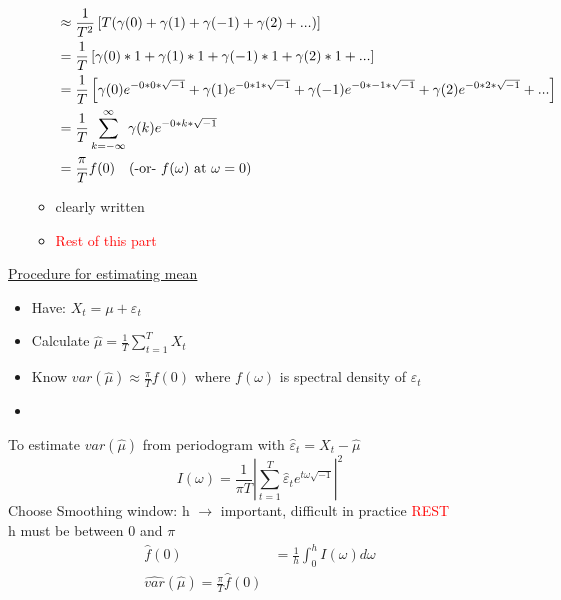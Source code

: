 \begin{itemize}
\begin{itemize}
\begin{align*}
            &\approx \frac{1}{T^2} \left[T(\gamma(0)+ \gamma(1)+\gamma(-1)+\gamma(2)+...) \right]\\
            &= \frac{1}{T} \left[\gamma(0)*1 + \gamma(1)*1+\gamma(-1)*1+\gamma(2)*1 +...\right] \\
            &= \frac{1}{T} \left[\gamma(0)e^{-0*0*\sqrt{-1}} + \gamma(1) e^{-0*1*\sqrt{-1}} + \gamma(-1) e^{-0*-1*\sqrt{-1}} + \gamma(2) e^{-0*2*\sqrt{-1}}+... \right] \\
            &=\frac{1}{T} \sum_{k=-\infty}^\infty \gamma(k) e^{-0*k*\sqrt{-1}} \\
            &= \frac{\pi}{T} f(0) \text{\quad (-or- $f(\omega)$ at $\omega=0$)} \\
        \end{align*}
        \item[]  clearly written
        \item \textcolor{red}{Rest of this part}
    \end{itemize}
\end{itemize}

\underline{Procedure for estimating mean}
\begin{itemize}
    \item Have: $X_t = \mu + \varepsilon_t$
    \item Calculate $\hat{\mu} = \frac{1}{T} \sum_{t=1}^T X_t$
    \item Know $var(\hat{\mu}) \approx \frac{\pi}{T} f(0)$ where $f(\omega)$ is spectral density of $\varepsilon_t$
    \item 
\end{itemize}
To estimate $var(\hat{\mu})$ from periodogram with $\hat{\varepsilon}_t=X_t-\hat{\mu}$ \[I(\omega)=\frac{1}{\pi T} \left| \sum_{t=1}^T \hat{\varepsilon}_t e^{t\omega \sqrt{-1}} \right|^2 \]
Choose Smoothing window: h $\rightarrow$ important, difficult in practice \textcolor{red}{REST}\\
\quad h must be between $0$ and $\pi$
\begin{align*}
    \hat{f}(0) &= \frac{1}{h} \int_0^h I(\omega)d\omega \\
    \hat{var}(\hat{\mu}) = \frac{\pi}{T}\hat{f}(0)
\end{align*}
